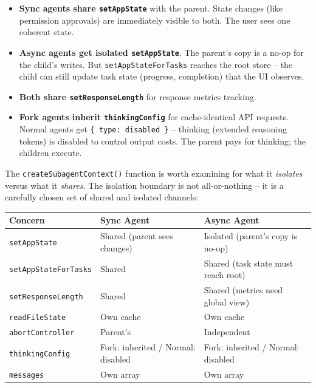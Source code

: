 \documentclass[
  english,
  11pt,
  letterpaper,
]{book}
\providecommand{\tightlist}{%
  \setlength{\itemsep}{0pt}\setlength{\parskip}{0pt}}
\begin{document}
\begin{itemize}
\tightlist
\item
  \textbf{Sync agents share \texttt{setAppState}} with the parent. State
  changes (like permission approvals) are immediately visible to both.
  The user sees one coherent state.
\item
  \textbf{Async agents get isolated \texttt{setAppState}}. The parent's
  copy is a no-op for the child's writes. But
  \texttt{setAppStateForTasks} reaches the root store -- the child can
  still update task state (progress, completion) that the UI observes.
\item
  \textbf{Both share \texttt{setResponseLength}} for response metrics
  tracking.
\item
  \textbf{Fork agents inherit \texttt{thinkingConfig}} for
  cache-identical API requests. Normal agents get
  \texttt{\{\ type:\ \textquotesingle{}disabled\textquotesingle{}\ \}}
  -- thinking (extended reasoning tokens) is disabled to control output
  costs. The parent pays for thinking; the children execute.
\end{itemize}

The \texttt{createSubagentContext()} function is worth examining for
what it \emph{isolates} versus what it \emph{shares}. The isolation
boundary is not all-or-nothing -- it is a carefully chosen set of shared
and isolated channels:

\begin{longtable}[]{@{}
  >{\raggedright\arraybackslash}p{}
  >{\raggedright\arraybackslash}p{}
  >{\raggedright\arraybackslash}p{}@{}}
\toprule\noalign{}
\begin{minipage}[b]{\linewidth}\raggedright
Concern
\end{minipage} & \begin{minipage}[b]{\linewidth}\raggedright
Sync Agent
\end{minipage} & \begin{minipage}[b]{\linewidth}\raggedright
Async Agent
\end{minipage} \\
\midrule\noalign{}
\endhead
\bottomrule\noalign{}
\endlastfoot
\texttt{setAppState} & Shared (parent sees changes) & Isolated (parent's
copy is no-op) \\
\texttt{setAppStateForTasks} & Shared & Shared (task state must reach
root) \\
\texttt{setResponseLength} & Shared & Shared (metrics need global
view) \\
\texttt{readFileState} & Own cache & Own cache \\
\texttt{abortController} & Parent's & Independent \\
\texttt{thinkingConfig} & Fork: inherited / Normal: disabled & Fork:
inherited / Normal: disabled \\
\texttt{messages} & Own array & Own array \\
\end{longtable}
\end{document}
